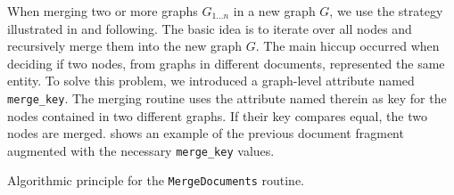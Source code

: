 When merging two or more graphs $G_{1...n}$ in a new graph $G$, we use the strategy illustrated in  and following. The basic idea is to iterate over all nodes and recursively merge them into the new graph $G$. The main hiccup occurred when deciding if two nodes, from graphs in different documents, represented the same entity. To solve this problem, we introduced a graph-level attribute named \texttt{merge\_key}. The merging routine uses the attribute named therein as key for the nodes contained in two different graphs. If their key compares equal, the two nodes are merged.  shows an example of the previous document fragment augmented with the necessary \texttt{merge\_key} values.

\begin{algorithm}[p]
\begin{algorithmic}
  \SetAlgoLined
  \SetNlSty{}{}{}
  \DontPrintSemicolon


  \BlankLine

  \CopyAttributeDefinitions{\d, \dd}\;
  \BlankLine

  \MergeGraphs{\GetGraph{\d}, \GetGraph{\dd}}
\end{algorithmic}  
\caption[Algorithmic principle for the \texttt{MergeDocuments} routine.]{Algorithmic principle for the \texttt{MergeDocuments} routine.}
\label{alg:mergedoc}
\end{algorithm}


